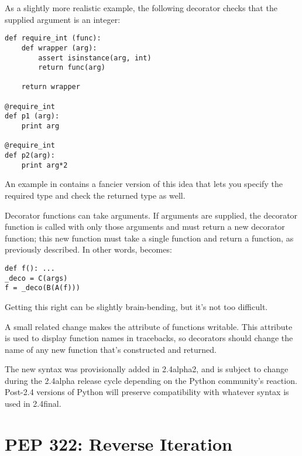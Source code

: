 \documentclass{howto}
\begin{document}
As a slightly more realistic example, the following decorator checks
that the supplied argument is an integer:

\begin{verbatim}
def require_int (func):
    def wrapper (arg):
        assert isinstance(arg, int)
        return func(arg)

    return wrapper

@require_int
def p1 (arg):
    print arg

@require_int
def p2(arg):
    print arg*2
\end{verbatim}

An example in  contains a fancier version of this idea that
lets you specify the required type and check the returned type as
well.

Decorator functions can take arguments.  If arguments are supplied,
the decorator function is called with only those arguments and must
return a new decorator function; this new function must take a single
function and return a function, as previously described.  In other
words,  becomes:

\begin{verbatim}
def f(): ...
_deco = C(args)
f = _deco(B(A(f)))
\end{verbatim}

Getting this right can be slightly brain-bending, but it's not too
difficult.

A small related change makes the  attribute of
functions writable.  This attribute is used to display function names
in tracebacks, so decorators should change the name of any new
function that's constructed and returned.

The new syntax was provisionally added in 2.4alpha2, and is subject to
change during the 2.4alpha release cycle depending on the Python
community's reaction.  Post-2.4 versions of Python will preserve
compatibility with whatever syntax is used in 2.4final.

\begin{seealso}
\end{seealso}

\section{PEP 322: Reverse Iteration}
\end{document}
